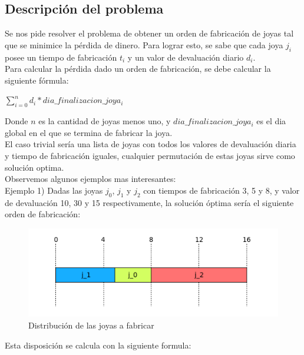 \subsection{Descripci\'on del problema}

Se nos pide resolver el problema de obtener un orden de fabricaci\'on de joyas tal que se minimice la p\'erdida de dinero. Para lograr esto, se sabe que cada joya $j_{i}$ posee un tiempo de fabricaci\'on $t_{i}$ y un valor de devaluaci\'on diario $d_{i}$. \\

Para calcular la p\'erdida dado un orden de fabricaci\'on, se debe calcular la siguiente f\'ormula:

$\sum\limits_{i=0}^n d_{i}*dia\_finalizacion\_joya_{i}$

Donde $n$ es la cantidad de joyas menos uno, y $dia\_finalizacion\_joya_{i}$ es el dia global en el que se termina de fabricar la joya.\\

El caso trivial ser\'ia una lista de joyas con todos los valores de devaluaci\'on diaria y tiempo de fabricaci\'on iguales, cualquier permutaci\'on de estas joyas sirve como soluci\'on optima. \\ 

Observemos algunos ejemplos mas interesantes: \\

Ejemplo 1) Dadas las joyas $j_{0}$, $j_{1}$ y $j_{2}$ con tiempos de fabricaci\'on 3, 5 y 8, y valor de devaluaci\'on 10, 30 y 15 respectivamente, la soluci\'on \'optima ser\'ia el siguiente orden de fabricaci\'on:

\begin{center}
\begin{figure}[h]
\includegraphics[scale=0.7]{./img/ej2_chart1.png}
\caption{Distribuci\'on de las joyas a fabricar}
\end{figure}
\end{center}

Esta disposici\'on se calcula con la siguiente formula:

